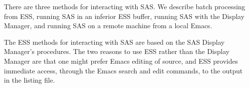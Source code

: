 \documentclass{article}
\newcommand{\stexttt}[1]{{\small\texttt{#1}}}
\begin{document}
There are three methods for interacting with SAS.  We describe batch
processing from ESS, running SAS in an inferior ESS buffer, running
SAS with the Display Manager, and running SAS on a remote machine from
a local Emacs.

The ESS methods for interacting with SAS are based on the SAS Display
Manager's procedures.  The two reasons to use ESS rather than the
Display Manager are that one might prefer Emacs editing of source, and
ESS provides immediate access, through the Emacs search and edit
commands, to the output in the listing file.
 

\end{document}
